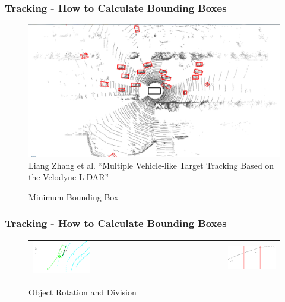 \documentclass[nosymbols]{beamer}	%
\begin{document}
\begin{frame}
\frametitle{Tracking - How to Calculate Bounding Boxes}
\begin{figure}[!ht]
\begin{center}
\caption{Minimum Bounding Box}
\includegraphics[width=\textwidth,height=0.68\textheight,keepaspectratio]{bilder/min_bound_wrong.png}\\
\tiny{Liang Zhang et al. ``Multiple Vehicle-like Target Tracking Based on the Velodyne LiDAR''}
\end{center}
\end{figure}
\end{frame}


\begin{frame}
\frametitle{Tracking - How to Calculate Bounding Boxes}
\begin{figure}[!ht]
\caption{Object Rotation and Division}
\begin{tabular}{ l r }
 \includegraphics[width=0.45\textwidth,height=0.7\textheight,keepaspectratio]{bilder/obst_rot.png} &
 \includegraphics[width=0.45\textwidth,height=0.7\textheight,keepaspectratio]{bilder/obst_devide.png}
\end{tabular}
\label{segments}
\end{figure}
\end{frame}
\end{document}
